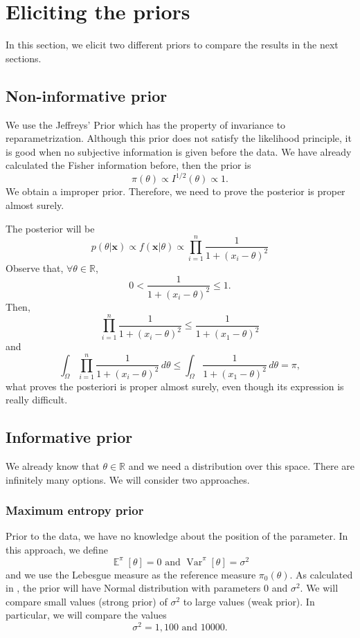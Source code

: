 \documentclass[a4paper,10pt, notitlepage]{report}
\theoremstyle{plain}
\newcommand{\var}{\operatorname{Var}} %
\newcommand{\ev}{\operatorname{\mathbb{E}}}
\newcommand{\bx}{\boldsymbol{x}} %
\newcommand{\R}{\mathbb{R}}
\begin{document}
\section*{Eliciting the priors}
\label{sec:priors}

In this section, we elicit two different priors to compare the results in the
next sections. 

\subsection*{Non-informative prior}

We use the Jeffreys' Prior which has the property of invariance to
reparametrization. Although this prior does not satisfy the likelihood
principle, it is good when no subjective information is given before the data.
We have already calculated the Fisher information before, then the prior is 
\begin{equation}
    \label{eq:jeffreys-prior}
    \pi(\theta) \propto I^{1/2}(\theta) \propto 1.
\end{equation}
We obtain a improper prior. Therefore, we need to prove the posterior is
proper almost surely.

The posterior will be 
$$
p(\theta|\bx) \propto f(\bx|\theta) \propto \prod_{i=1}^n \frac{1}{1 + (x_i - \theta)^2}
$$
Observe that, $\forall \theta \in \R$,
$$
0 < \frac{1}{1 + (x_i - \theta)^2} \le 1.
$$
Then, 
$$
\prod_{i=1}^n \frac{1}{1 + (x_i - \theta)^2} \le \frac{1}{1 + (x_1 - \theta)^2}
$$
and
$$
\int_{\Omega} \prod_{i=1}^n \frac{1}{1 + (x_i - \theta)^2} \, d\theta \le \int_{\Omega} \frac{1}{1 + (x_1 - \theta)^2} \, d\theta = \pi,
$$
what proves the posteriori is proper almost surely, even though its expression
is really difficult. 

\subsection*{Informative prior}

We already know that $\theta \in \R$ and we need a distribution over this space.
There are infinitely many options. We will consider two approaches. 

\subsubsection*{Maximum entropy prior}

Prior to the data, we have no knowledge about the position of the parameter.
In this approach, we define 
$$
\ev^{\pi}[\theta] = 0 \text{ and } \var^{\pi}[\theta] = \sigma^2
$$
and we use the Lebesgue measure as the reference measure $\pi_0(\theta)$. As
calculated in \cite[Example 3.2.4]{Robert2007}, the prior will have Normal
distribution with parameters $0$ and $\sigma^2$. We will compare small values
(strong prior) of $\sigma^2$ to large values (weak prior). In particular, we
will compare the values 
$$\sigma^2 = 1, 100 \text{ and }  10000.$$
\end{document}
